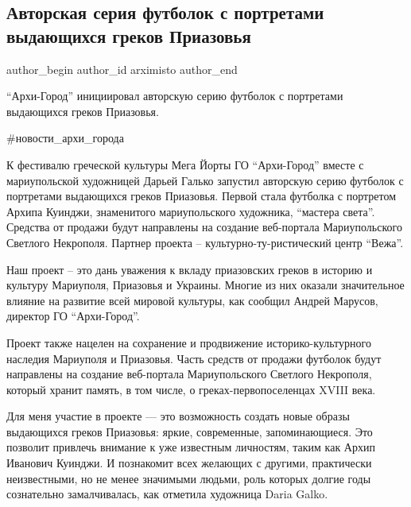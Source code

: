  
 
 
 
 

\subsection{Авторская серия футболок с портретами выдающихся греков Приазовья}
\label{sec:24_09_2021.fb.arximisto.1.seria_futbolok_portrety_grekov_priazovja}

\ifcmt
 author_begin
   author_id arximisto
 author_end
\fi

\enquote{Архи-Город} инициировал авторскую серию футболок с портретами выдающихся греков Приазовья.

\#новости\_архи\_города

К фестивалю греческой культуры Мега Йорты ГО \enquote{Архи-Город} вместе с
мариупольской художницей Дарьей Галько запустил авторскую серию футболок с
портретами выдающихся греков Приазовья. Первой стала футболка с портретом
Архипа Куинджи, знаменитого мариупольского художника, \enquote{мастера света}. Средства
от продажи будут направлены на создание веб-портала Мариупольского Светлого
Некрополя. Партнер проекта – культурно-ту\hyp{}ристический центр \enquote{Вежа}.

Наш проект – это дань уважения к вкладу приазовских греков в историю и культуру
Мариуполя, Приазовья и Украины. Многие из них оказали значительное влияние на
развитие всей мировой культуры, как сообщил Андрей Марусов, директор ГО
\enquote{Архи-Город}.

Проект также нацелен на сохранение и продвижение историко-культурного наследия
Мариуполя и Приазовья. Часть средств от продажи футболок будут направлены на
создание веб-портала Мариупольского Светлого Некрополя, который хранит память,
в том числе, о греках-первопоселенцах XVIII века.

Для меня участие в проекте — это возможность создать новые образы выдающихся
греков Приазовья: яркие, современные, запоминающиеся. Это позволит привлечь
внимание к уже известным личностям, таким как Архип Иванович Куинджи. И
познакомит всех желающих с другими, практически неизвестными, но не менее
значимыми людьми, роль которых долгие годы сознательно замалчивалась, как
отметила художница Daria Galko.  

